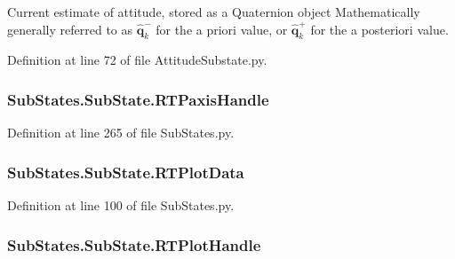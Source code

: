 Current estimate of attitude, stored as a Quaternion object Mathematically generally referred to as $\mathbf{\hat{q}}^{-}_{k}$ for the a priori value, or $\mathbf{\hat{q}}^{+}_{k}$ for the a posteriori value. 



Definition at line 72 of file Attitude\+Substate.\+py.

\subsubsection[{\texorpdfstring{R\+T\+Paxis\+Handle}{RTPaxisHandle}}]{\setlength{\rightskip}{0pt plus 5cm}Sub\+States.\+Sub\+State.\+R\+T\+Paxis\+Handle\hspace{0.3cm}{\ttfamily [inherited]}}\hypertarget{classSubStates_1_1SubState_a41c912457be8682326d60f82cc651207}{}\label{classSubStates_1_1SubState_a41c912457be8682326d60f82cc651207}


Definition at line 265 of file Sub\+States.\+py.

\subsubsection[{\texorpdfstring{R\+T\+Plot\+Data}{RTPlotData}}]{\setlength{\rightskip}{0pt plus 5cm}Sub\+States.\+Sub\+State.\+R\+T\+Plot\+Data\hspace{0.3cm}{\ttfamily [inherited]}}\hypertarget{classSubStates_1_1SubState_aae3aa07f0d6f54a510db66e0644c958e}{}\label{classSubStates_1_1SubState_aae3aa07f0d6f54a510db66e0644c958e}


Definition at line 100 of file Sub\+States.\+py.

\subsubsection[{\texorpdfstring{R\+T\+Plot\+Handle}{RTPlotHandle}}]{\setlength{\rightskip}{0pt plus 5cm}Sub\+States.\+Sub\+State.\+R\+T\+Plot\+Handle\hspace{0.3cm}{\ttfamily [inherited]}}\hypertarget{classSubStates_1_1SubState_ab92a0fafcfd778b8965e3f649ff94fc7}{}\label{classSubStates_1_1SubState_ab92a0fafcfd778b8965e3f649ff94fc7}


